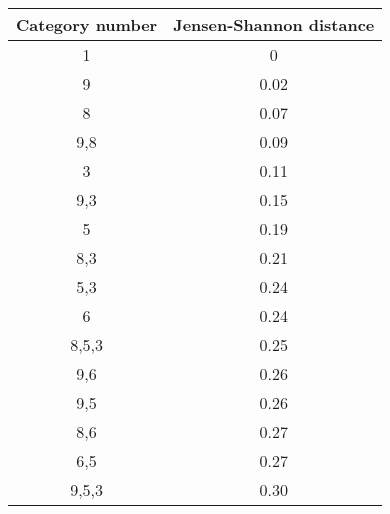 \begin{tabular}{|c|c|}
    \hline
    Category number    & Jensen-Shannon distance  \\ \hline
    1                  & 0          \\ \hline
    9                & 0.02       \\ \hline
    8                & 0.07       \\ \hline
    9,8                & 0.09       \\ \hline
    3                  & 0.11       \\ \hline
    9,3                & 0.15       \\ \hline
    5                 & 0.19       \\ \hline
    8,3                & 0.21       \\ \hline
    5,3                 & 0.24       \\ \hline
    6                 & 0.24       \\ \hline
    8,5,3                & 0.25       \\ \hline
    9,6                & 0.26       \\ \hline
    9,5                & 0.26       \\ \hline
    8,6                & 0.27       \\ \hline
    6,5                 & 0.27       \\ \hline
    9,5,3                & 0.30       \\ \hline
\end{tabular}